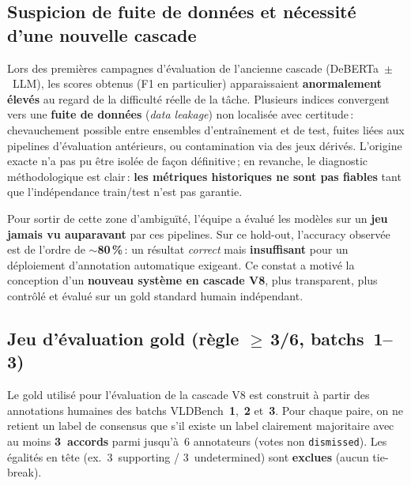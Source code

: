 
\subsection*{Suspicion de fuite de données et nécessité d'une nouvelle cascade}

Lors des premières campagnes d'évaluation de l'ancienne cascade (DeBERTa~$\pm$~LLM), les scores obtenus (F1 en particulier) apparaissaient \textbf{anormalement élevés} au regard de la difficulté réelle de la tâche. Plusieurs indices convergent vers une \textbf{fuite de données} (\textit{data leakage}) non localisée avec certitude\,: chevauchement possible entre ensembles d'entraînement et de test, fuites liées aux pipelines d'évaluation antérieurs, ou contamination via des jeux dérivés. L'origine exacte n'a pas pu être isolée de façon définitive\,; en revanche, le diagnostic méthodologique est clair\,: \textbf{les métriques historiques ne sont pas fiables} tant que l'indépendance train/test n'est pas garantie.

Pour sortir de cette zone d'ambiguïté, l'équipe a évalué les modèles sur un \textbf{jeu jamais vu auparavant} par ces pipelines. Sur ce hold-out, l'accuracy observée est de l'ordre de \textbf{$\sim$80\,\%}\,: un résultat \emph{correct} mais \textbf{insuffisant} pour un déploiement d'annotation automatique exigeant. Ce constat a motivé la conception d'un \textbf{nouveau système en cascade V8}, plus transparent, plus contrôlé et évalué sur un gold standard humain indépendant.

\subsection*{Jeu d'évaluation gold (règle $\ge$\,3/6, batchs~1--3)}

Le gold utilisé pour l'évaluation de la cascade V8 est construit à partir des annotations humaines des batchs VLDBench~\textbf{1},~\textbf{2} et~\textbf{3}. Pour chaque paire, on ne retient un label de consensus que s'il existe un label clairement majoritaire avec au moins \textbf{3~accords} parmi jusqu'à~6 annotateurs (votes non \texttt{dismissed}). Les égalités en tête (ex.\ 3~supporting / 3~undetermined) sont \textbf{exclues} (aucun tie-break).

